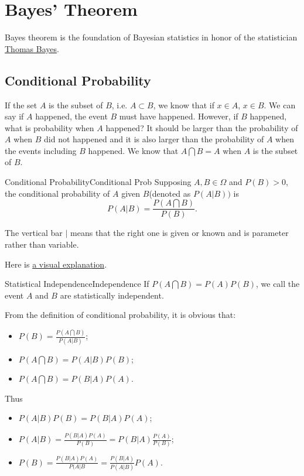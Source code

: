 \documentclass[titlestyle=hang,11pt]{elegantbook}
\begin{document}
\section{Bayes' Theorem}

Bayes theorem is the foundation of Bayesian statistics in honor of the statistician \href{https://en.wikipedia.org/wiki/Thomas_Bayes}{Thomas Bayes}.

\subsection{Conditional Probability}

If the set $A$ is the subset of $B$, i.e. $A\subset B$, we know that if $x\in A$, $x\in B$.
We can say if $A$ happened, the event $B$ must have happened. However, if $B$ happened, what is probability when $A$ happened? It should be larger than the probability of $A$ when $B$ did not happened and it is also larger than the probability of $A$ when the events including $B$ happened. We know that $A\bigcap B=A$ when $A$ is the subset of $B$.
\begin{definition}{Conditional Probability}{Conditional Prob}
	Supposing $A, B\in \Omega$ and $P(B) > 0$, the conditional probability of $A$ given $B$(denoted as $P(A|B))$ is
	\[ P(A|B)=\frac{P(A\bigcap B)}{P(B)}. \]
\end{definition}
The vertical bar $|$ means that the right one is given or known and is parameter rather than variable.

Here is \href{http://setosa.io/conditional/}{a visual explanation}.

\begin{definition}{Statistical Independence}{Independence}
	If $P(A\bigcap B)= P(A)P(B)$, we call the event $A$ and $B$ are statistically independent.
\end{definition}

From the definition of conditional probability, it is obvious that:
\begin{itemize}
	\item $P(B)=\frac{P(A\bigcap B)}{P(A|B)}$;
	\item $P(A\bigcap B)=P(A|B)P(B)$;
	\item $P(A\bigcap B)=P(B|A)P(A)$.
\end{itemize}
Thus
\begin{itemize}
	\item $P(A|B)P(B)=P(B|A)P(A)$;
	\item $P(A|B)=\frac{P(B|A)P(A)}{P(B)}=P(B|A) \frac{P(A)}{P(B)}$;
	\item $P(B)=\frac{P(B|A)P(A)}{P(A|B}=\frac{P(B|A)}{P(A|B)}P(A)$.
\end{itemize}
\end{document}
